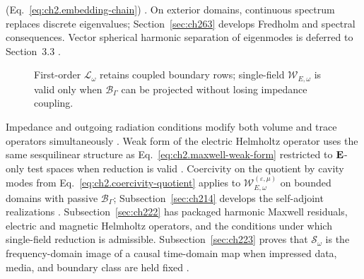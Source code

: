 (Eq.~\eqref{eq:ch2.embedding-chain}) \cite{stratton1941}. On exterior domains,
continuous spectrum replaces discrete eigenvalues; Section~\ref{sec:ch263} develops
Fredholm and spectral consequences. Vector spherical harmonic separation of
eigenmodes is deferred to Section~3.3 \cite{harrington2001}.
\begin{figure}[t]
\centering
{}
\caption{First-order \(\mathcal{L}_\omega\) retains coupled boundary rows; single-field
\(\mathcal{W}_{E,\omega}\) is valid only when \(\mathcal{B}_\Gamma\) can be
projected without losing impedance coupling.}
\label{fig:ch2.first-order-vs-helmholtz}
\end{figure}
Impedance and outgoing radiation conditions modify both volume and trace operators
simultaneously \cite{stratton1941}. Weak form of the electric Helmholtz operator uses the same sesquilinear structure as
Eq.~\eqref{eq:ch2.maxwell-weak-form} restricted to \(\mathbf{E}\)-only test spaces when
reduction is valid \cite{stratton1941}. Coercivity on the quotient by cavity modes
from Eq.~\eqref{eq:ch2.coercivity-quotient} applies to
\(\mathcal{W}_{E,\omega}^{(\varepsilon,\mu)}\) on bounded domains with passive
\(\mathcal{B}_\Gamma\); Subsection~\ref{sec:ch214} develops the self-adjoint realizations
\cite{harrington2001}.
Subsection~\ref{sec:ch222} has packaged harmonic Maxwell residuals, electric and magnetic
Helmholtz operators, and the conditions under which single-field reduction is admissible.
Subsection~\ref{sec:ch223} proves that \(\mathcal{S}_\omega\) is the frequency-domain
image of a causal time-domain map when impressed data, media, and boundary class are held
fixed \cite{stratton1941}.
